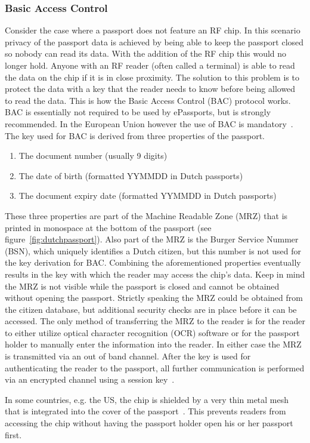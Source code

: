 \subsubsection{Basic Access Control}
Consider the case where a passport does not feature an RF chip. In this scenario privacy of the passport data is achieved by being able to keep the passport closed so nobody can read its data. With the addition of the RF chip this would no longer hold. Anyone with an RF reader (often called a terminal) is able to read the data on the chip if it is in close proximity. The solution to this problem is to protect the data with a key that the reader needs to know before being allowed to read the data. This is how the Basic Access Control (BAC) protocol works. BAC is essentially not required to be used by ePassports, but is strongly recommended. In the European Union however the use of BAC is mandatory~\cite{icao}. The key used for BAC is derived from three properties of the passport.
\begin{enumerate}
	\item The document number (usually 9 digits)
  \item The date of birth (formatted YYMMDD in Dutch passports)
  \item The document expiry date (formatted YYMMDD in Dutch passports)
\end{enumerate}
These three properties are part of the Machine Readable Zone (MRZ) that is printed in monospace at the bottom of the passport (see figure~\ref{fig:dutchpassport}). Also part of the MRZ is the Burger Service Nummer (BSN), which uniquely identifies a Dutch citizen, but this number is not used for the key derivation for BAC. Combining the aforementioned properties eventually results in the key with which the reader may access the chip's data. Keep in mind the MRZ is not visible while the passport is closed and cannot be obtained without opening the passport. Strictly speaking the MRZ could be obtained from the citizen database, but additional security checks are in place before it can be accessed. The only method of transferring the MRZ to the reader is for the reader to either utilize optical character recognition (OCR) software or for the passport holder to manually enter the information into the reader. In either case the MRZ is transmitted via an out of band channel. After the key is used for authenticating the reader to the passport, all further communication is performed via an encrypted channel using a session key~\cite{icao}.

In some countries, e.g. the US, the chip is shielded by a very thin metal mesh that is integrated into the cover of the passport~\cite{encuspassports}. This prevents readers from accessing the chip without having the passport holder open his or her passport first.

